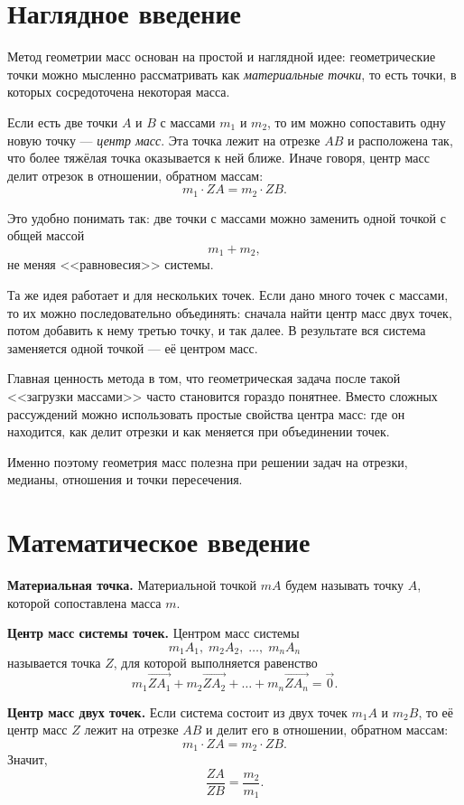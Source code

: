 \section*{Наглядное введение}

Метод геометрии масс основан на простой и наглядной идее: геометрические точки можно мысленно рассматривать как \textit{материальные точки}, то есть точки, в которых сосредоточена некоторая масса.

Если есть две точки $A$ и $B$ с массами $m_1$ и $m_2$, то им можно сопоставить одну новую точку --- \textit{центр масс}. Эта точка лежит на отрезке $AB$ и расположена так, что более тяжёлая точка оказывается к ней ближе. Иначе говоря, центр масс делит отрезок в отношении, обратном массам:
\[
m_1 \cdot ZA = m_2 \cdot ZB.
\]

Это удобно понимать так: две точки с массами можно заменить одной точкой с общей массой
\[
m_1 + m_2,
\]
не меняя <<равновесия>> системы.

Та же идея работает и для нескольких точек. Если дано много точек с массами, то их можно последовательно объединять: сначала найти центр масс двух точек, потом добавить к нему третью точку, и так далее. В результате вся система заменяется одной точкой --- её центром масс.

Главная ценность метода в том, что геометрическая задача после такой <<загрузки массами>> часто становится гораздо понятнее. Вместо сложных рассуждений можно использовать простые свойства центра масс: где он находится, как делит отрезки и как меняется при объединении точек.

Именно поэтому геометрия масс полезна при решении задач на отрезки, медианы, отношения и точки пересечения.

\section*{Математическое введение}

\textbf{Материальная точка.}
Материальной точкой $mA$ будем называть точку $A$, которой сопоставлена масса $m$.

\medskip

\textbf{Центр масс системы точек.}
Центром масс системы
\[
m_1A_1,\; m_2A_2,\; \dots,\; m_nA_n
\]
называется точка $Z$, для которой выполняется равенство
\[
m_1\overrightarrow{ZA_1}+m_2\overrightarrow{ZA_2}+\dots+m_n\overrightarrow{ZA_n}=\vec 0.
\]

\medskip

\textbf{Центр масс двух точек.}
Если система состоит из двух точек $m_1A$ и $m_2B$, то её центр масс $Z$ лежит на отрезке $AB$ и делит его в отношении, обратном массам:
\[
m_1\cdot ZA = m_2\cdot ZB.
\]
Значит,
\[
\frac{ZA}{ZB}=\frac{m_2}{m_1}.
\]

